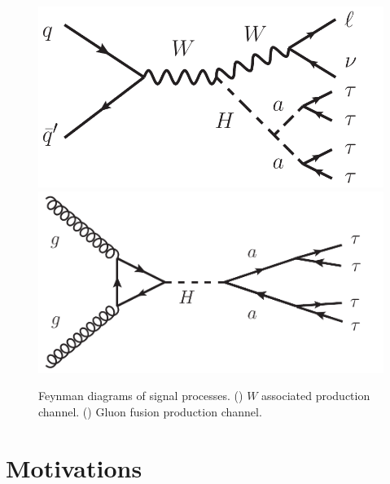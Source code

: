 \begin{figure}[hbtp]
  \begin{center}
    \includegraphics[width=\cmsFigWidth]{figures/FeynWH_ellnu4tau}
    \includegraphics[width=\cmsFigWidth]{figures/FeynggH_aa_4tau}
    \caption{Feynman diagrams of signal processes. (\cmsLeft) $W$ associated production channel. (\cmsRight) Gluon fusion production channel.}
    \label{fig:signatures}
  \end{center}
\end{figure}

\section{Motivations\label{sec:motivations}}

